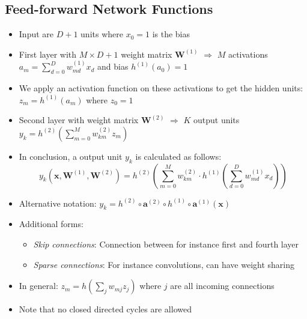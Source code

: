 \subsection{Feed-forward Network Functions}
\begin{itemize}
	\begin{figure}[ht]
		\centering
		\texttt{[image: figures/neural\_networks\_overview.png]}
		\caption{Illustration of a multilayer perceptron (2 layers).}
		\label{img:neural_networks_overview}
	\end{figure}
	\item Input are $D+1$ units where $x_0=1$ is the bias
	\item First layer with $M\times D+1$ weight matrix $\bm{W}^{(1)}$ $\Rightarrow$ $M$ activations $a_m = \sum\limits_{d=0}^{D} w_{md}^{(1)} x_{d}$ and bias $h^{(1)}(a_0)=1$
	\item We apply an activation function on these activations to get the hidden units: $z_m = h^{(1)}(a_m)$ where $z_0=1$
	\item Second layer with weight matrix $\bm{W}^{(2)}$ $\Rightarrow$ $K$ output units $y_k = h^{(2)}\left(\sum\limits_{m=0}^{M} w_{km}^{(2)}z_m\right)$
	\item In conclusion, a output unit $y_k$ is calculated as follows:
	$$y_k\left(\bm{x}, \bm{W}^{(1)}, \bm{W}^{(2)}\right) = h^{(2)}\left(\sum\limits_{m=0}^{M} w_{km}^{(2)}\cdot h^{(1)}\left(\sum\limits_{d=0}^{D} w_{md}^{(1)}x_{d}\right)\right)$$
	\item Alternative notation: $y_k = h^{(2)} \circ \bm{a}^{(2)} \circ h^{(1)} \circ \bm{a}^{(1)} (\bm{x})$
	\item Additional forms: 
	\begin{itemize}
		\item \textit{Skip connections}: Connection between for instance first and fourth layer
		\item \textit{Sparse connections}: For instance convolutions, can have weight sharing
	\end{itemize}
	\item In general: $z_m = h\left(\sum\limits_{j}w_{mj}z_{j}\right)$ where $j$ are all incoming connections
	\item Note that no closed directed cycles are allowed
\end{itemize}
